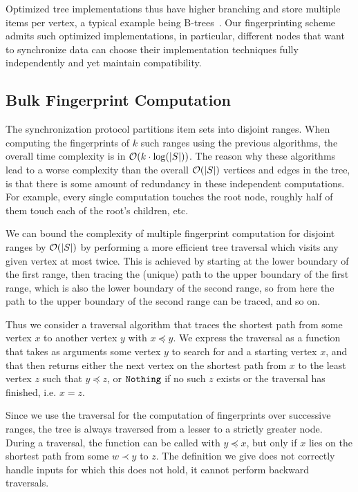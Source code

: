 Optimized tree implementations thus have higher branching and store multiple items per vertex, a typical example being B-trees~\cite{bayer2002organization}. Our fingerprinting scheme admits such optimized implementations, in particular, different nodes that want to synchronize data can choose their implementation techniques fully independently and yet maintain compatibility.

\subsection{Bulk Fingerprint Computation}
\label{bulk}

The synchronization protocol partitions item sets into disjoint ranges. When computing the fingerprints of $k$ such ranges using the previous algorithms, the overall time complexity is in $\mathcal{O}(k \cdot \log(|{S}|))$. The reason why these algorithms lead to a worse complexity than the overall $\mathcal{O}(|{S}|)$ vertices and edges in the tree, is that there is some amount of redundancy in these independent computations. For example, every single computation touches the root node, roughly half of them touch each of the root's children, etc.

We can bound the complexity of multiple fingerprint computation for disjoint ranges by $\mathcal{O}(|{S}|)$ by performing a more efficient tree traversal which visits any given vertex at most twice. This is achieved by starting at the lower boundary of the first range, then tracing the (unique) path to the upper boundary of the first range, which is also the lower boundary of the second range, so from here the path to the upper boundary of the second range can be traced, and so on.

Thus we consider a traversal algorithm that traces the shortest path from some vertex $x$ to another vertex $y$ with $x \preceq y$. We express the traversal as a function that takes as arguments some vertex $y$ to search for and a starting vertex $x$, and that then returns either the next vertex on the shortest path from $x$ to the least vertex $z$ such that $y \preceq z$, or $\mathtt{Nothing}$ if no such $z$ exists or the traversal has finished, i.e. $x = z$.

Since we use the traversal for the computation of fingerprints over successive ranges, the tree is always traversed from a lesser to a strictly greater node. During a traversal, the function can be called with $y \preceq x$, but only if $x$ lies on the shortest path from some $w \prec y$ to $z$. The definition we give does not correctly handle inputs for which this does not hold, it cannot perform backward traversals.

